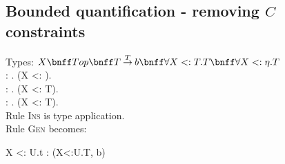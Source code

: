 \documentclass{article}
\begin{document}
\begin{thebibliography}{1}
\subsection{Bounded quantification - removing $C$ constraints}
Types: $ X \bnff Top \bnff \tfun{T}{b}{T} \bnff \forall X<:T. T \bnff \forall
X<:\eta.
T$ \\\irule[][]
  {}
  {
    \erequest{}{} : \forall \chi. \forall (X <: \eta).
  }
\\\irule[][]
  {}
  {
    \esend{} : \forall \chi. \forall (X <: T).
  }
\\\irule[][]
  {}
  {
    \erecv{} : \forall \chi. \forall (X <: T).
  }
\\
  Rule \textsc{Ins} is type application.
\\Rule \textsc{Gen} becomes:
\begin{center}
    {\Gamma \vdash \lambda X <: U.t : (\forall X<:U.T, b) }
\end{center}



\end{thebibliography}
\end{document}
